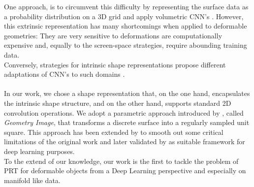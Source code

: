 One approach, is to circumvent this difficulty by representing the surface data as a probability distribution on a  3D grid and apply volumetric CNN's \cite{3d_ShapeNets}. However, this extrinsic representation has many shortcomings when applied to deformable geometries: They are very sensitive to deformations are computationally expensive and, equally to the screen-space strategies, require abounding training data.
\\
Conversely, strategies for intrinsic shape representations propose different adaptations of CNN's to such domains \cite{ShapeNet1, BoscainiMRB16, CNN_on_Torus}.
\\
\\ 
In our work, we chose a shape representation that, on the one hand, encapsulates the intrinsic shape structure, and on the other hand, supports standard 2D convolution operations. We adopt a parametric approach introduced by \cite{gu2002geometry}, called \textit{Geometry Image}, that transforms a discrete surface into a regularly sampled unit square. This approach has been extended by \cite{Spherical_Parametrization} to smooth out some critical limitations of the original work and later validated by \cite{sinha2016deep} as suitable framework for deep learning purposes.
\\
To the extend of our knowledge, our work is the first to tackle the problem of PRT for deformable objects from a Deep Learning perspective and especially on manifold like data. 


